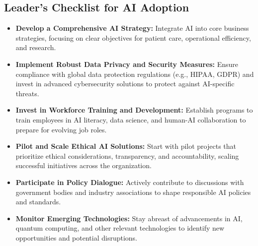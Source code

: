 \subsection{Leader's Checklist for AI Adoption}
\begin{itemize}
    \item \textbf{Develop a Comprehensive AI Strategy:} Integrate AI into core business strategies, focusing on clear objectives for patient care, operational efficiency, and research.
    \item \textbf{Implement Robust Data Privacy and Security Measures:} Ensure compliance with global data protection regulations (e.g., HIPAA, GDPR) and invest in advanced cybersecurity solutions to protect against AI-specific threats.
    \item \textbf{Invest in Workforce Training and Development:} Establish programs to train employees in AI literacy, data science, and human-AI collaboration to prepare for evolving job roles.
    \item \textbf{Pilot and Scale Ethical AI Solutions:} Start with pilot projects that prioritize ethical considerations, transparency, and accountability, scaling successful initiatives across the organization.
    \item \textbf{Participate in Policy Dialogue:} Actively contribute to discussions with government bodies and industry associations to shape responsible AI policies and standards.
    \item \textbf{Monitor Emerging Technologies:} Stay abreast of advancements in AI, quantum computing, and other relevant technologies to identify new opportunities and potential disruptions.
\end{itemize}